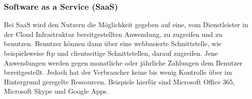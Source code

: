 \subsubsection{Software as a Service (SaaS)}

Bei SaaS wird den Nutzern die Möglichkeit gegeben auf eine, vom Dienstleister in der Cloud Infrastruktur bereitgestellten Anwendung, zu zugreifen und zu benutzen. Benutzer können dann über eine webbasierte Schnittstelle, wie beispielsweise ftp und clientseitige Schnittstellen, darauf zugreifen. Jene Anwendungen werden gegen monatliche oder jährliche Zahlungen dem Benutzer bereitgestellt. Jedoch hat der Verbraucher keine bis wenig Kontrolle über im Hintergrund geregelte Ressourcen. Beispiele hierfür sind Microsoft Office 365, Microsoft Skype und Google Apps.